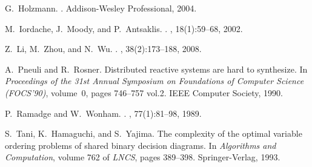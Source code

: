 \documentclass[10pt, a4paper, onecolumn, conference, compsocconf]{IEEEtran}
\begin{document}
\begin{thebibliography}{10}
G.~Holzmann.
.
\newblock Addison-Wesley Professional, 2004.

M.~Iordache, J.~Moody, and P.~Antsaklis.
.
, 18(1):59--68,
  2002.

Z.~Li, M.~Zhou, and N.~Wu.
.
, 38(2):173--188, 2008.

A.~Pneuli and R.~Rosner.
\newblock Distributed reactive systems are hard to synthesize.
\newblock In {\em Proceedings of the 31st Annual Symposium on Foundations of
  Computer Science (FOCS'90)}, volume~0, pages 746--757 vol.2. IEEE Computer
  Society, 1990.

P.~Ramadge and W.~Wonham.
.
, 77(1):81--98, 1989.

S.~Tani, K.~Hamaguchi, and S.~Yajima.
\newblock The complexity of the optimal variable ordering problems of shared
  binary decision diagrams.
\newblock In {\em Algorithms and Computation}, volume 762 of {\em LNCS}, pages
  389--398. Springer-Verlag, 1993.

\end{thebibliography}
\end{document}
